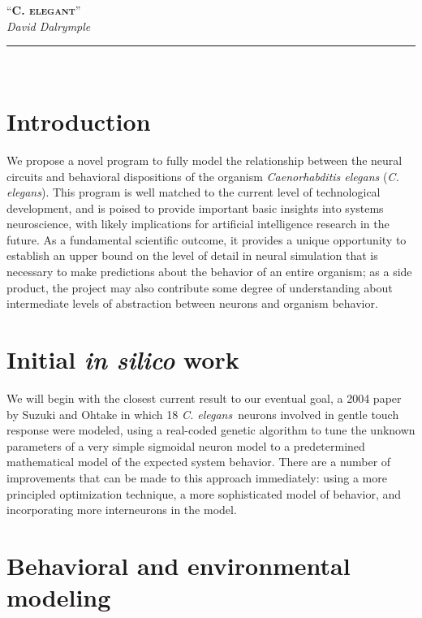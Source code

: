 \documentclass[letter,11pt]{article}
\newcommand{\cel}{{\em C. elegans}}
\begin{document}
\begin{center}
	\textsc{\LARGE ``{\bfseries C. elegant}''}\\[1mm]
	\textit{David Dalrymple}\\[1mm]
	\rule[2mm]{0.66\textwidth}{0.25mm}\\[10mm]
\end{center}

\section{Introduction}

We propose a novel program to fully model the relationship between the neural
circuits and behavioral dispositions of the organism {\em Caenorhabditis
elegans} (\cel).  This program is well matched to the current level of
technological development, and is poised to provide important basic insights
into systems neuroscience, with likely implications for artificial intelligence
research in the future. As a fundamental scientific outcome, it provides a
unique opportunity to establish an upper bound on the level of detail in neural
simulation that is necessary to make predictions about the behavior of an
entire organism; as a side product, the project may also contribute some degree
of understanding about intermediate levels of abstraction between neurons and
organism behavior.

\section{Initial {\em in silico} work}
\label{initial}

We will begin with the closest current result to our eventual goal, a 2004
paper by Suzuki and Ohtake \cite{ohtake} in which 18 \cel\ neurons involved in
gentle touch response were modeled, using a real-coded genetic algorithm to
tune the unknown parameters of a very simple sigmoidal neuron model to a
predetermined mathematical model of the expected system behavior. There are a
number of improvements that can be made to this approach immediately: using a
more principled optimization technique, a more sophisticated model of behavior,
and incorporating more interneurons in the model.

\section{Behavioral and environmental modeling}
\end{document}
